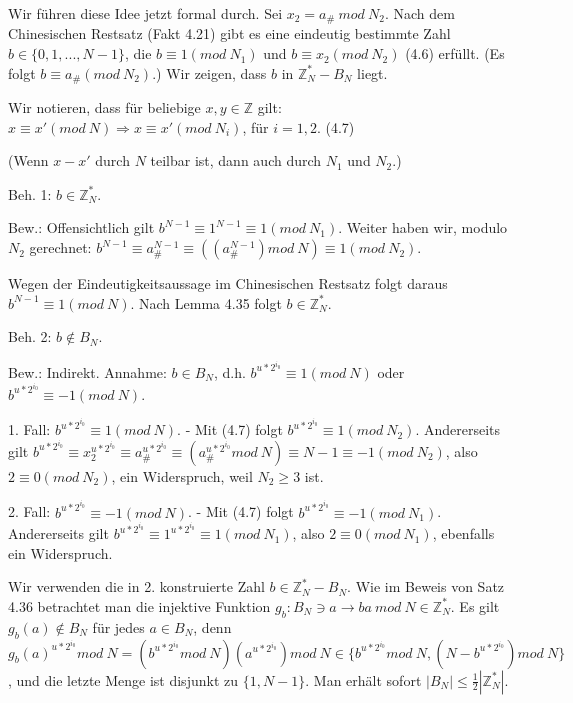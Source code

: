 \documentclass[a4paper]{article}
\begin{document}
\begin{multicols}{3}
\begin{enumerate*}
\begin{itemize*}
                \item Wir führen diese Idee jetzt formal durch. Sei $x_2=a_{\#}\ mod\ N_2$. Nach dem Chinesischen Restsatz (Fakt 4.21) gibt es eine eindeutig bestimmte Zahl $b\in\{0,1,...,N- 1\}$, die $b\equiv 1(mod\ N_1)$ und $b\equiv x_2(mod\ N_2)$ (4.6) erfüllt. (Es folgt $b\equiv a_{\#}(mod\ N_2)$.) Wir zeigen, dass $b$ in $\mathbb{Z}^*_N-B_N$ liegt.
                \item Wir notieren, dass für beliebige $x,y\in\mathbb{Z}$ gilt: $x\equiv x'(mod\ N)\Rightarrow x\equiv x'(mod\ N_i)$, für $i=1,2$. (4.7)
                \item (Wenn $x-x'$ durch $N$ teilbar ist, dann auch durch $N_1$ und $N_2$.)
                \item Beh. 1: $b\in\mathbb{Z}^*_N$.
                \item Bew.: Offensichtlich gilt $b^{N-1} \equiv 1^{N-1} \equiv 1 (mod\ N_1)$. Weiter haben wir, modulo $N_2$ gerechnet: $b^{N-1} \equiv a^{N-1}_{\#}\equiv ((a^{N-1}_{\#}) mod\ N)\equiv 1 (mod\ N_2)$.
                \item Wegen der Eindeutigkeitsaussage im Chinesischen Restsatz folgt daraus $b^{N-1} \equiv 1(mod\ N)$. Nach Lemma 4.35 folgt $b\in\mathbb{Z}^*_N$.
                \item Beh. 2: $b\not\in B_N$.
                \item Bew.: Indirekt. Annahme: $b\in B_N$, d.h. $b^{u*2^{i_0}} \equiv 1 (mod\ N)$ oder $b^{u*2^{i_0}} \equiv -1 (mod\ N)$.
                \item 1. Fall: $b^{u*2^{i_0}} \equiv 1 (mod\ N)$. - Mit (4.7) folgt $b^{u*2^{i_0}} \equiv 1 (mod\ N_2)$. Andererseits gilt $b^{u*2^{i_0}} \equiv x^{u*2^{i_0}}_2 \equiv a^{u*2^{i_0}}_{\#}\equiv (a^{u*2^{i_0}}_{\#}mod\ N)\equiv N-1 \equiv -1 (mod\ N_2)$, also $2\equiv 0 (mod\ N_2)$, ein Widerspruch, weil $N_2 \geq 3$ ist.
                \item 2. Fall: $b^{u*2^{i_0}} \equiv -1 (mod\ N)$. - Mit (4.7) folgt $b^{u*2^{i_0}} \equiv -1(mod\ N_1)$. Andererseits gilt $b^{u*2^{i_0}} \equiv 1^{u*2^{i_0}} \equiv 1 (mod\ N_1)$, also $2\equiv 0 (mod\ N_1)$, ebenfalls ein Widerspruch.
            \end{itemize*}
            \item Wir verwenden die in 2. konstruierte Zahl $b\in\mathbb{Z}^*_N-B_N$. Wie im Beweis von Satz 4.36 betrachtet man die injektive Funktion $g_b:B_N \ni a\rightarrow ba\ mod\ N \in\mathbb{Z}^*_N$. Es gilt $g_b(a)\not\in B_N$ für jedes $a\in B_N$, denn $g_b(a)^{u*2^{i_0}} mod\ N= (b^{u*2^{i_0}} mod\ N)(a^{u*2^{i_0}}) mod\ N\in\{b^{u*2^{i_0}} mod\ N, (N-b^{u*2^{i_0}}) mod\ N\}$, und die letzte Menge ist disjunkt zu $\{1 ,N-1\}$. Man erhält sofort $|B_N|\leq \frac{1}{2} | \mathbb{Z}^*_N|$.
        \end{enumerate*}


\end{multicols}
\end{document}
